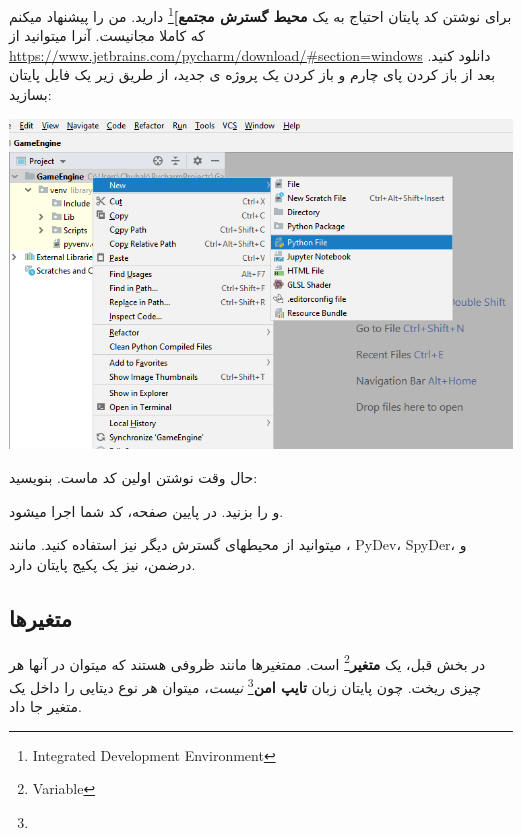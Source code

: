 \documentclass[14pt,a4paper]{memoir}
\begin{document}
	 برای نوشتن کد پایتان احتیاج به یک \textbf{محیط گسترش مجتمع]}\footnote{Integrated Development Environment} دارید. من  را پیشنهاد میکنم که کاملا مجانیست. آنرا میتوانید از \url{https://www.jetbrains.com/pycharm/download/#section=windows} دانلود کنید. 
	 بعد از باز کردن پای چارم و باز کردن یک پروژه ی جدید، از طریق زیر یک فایل پایتان بسازید:
	 
	 \begin{center}
	 	\includegraphics[scale=0.6]{CreateNewPythonFile}
	 	\end{center}
 	
 	حال وقت نوشتن اولین کد ماست. بنویسید:
 	
 	
 	\begin{latin}
 	
 \end{latin}
و   را بزنید. در پایین صفحه، کد شما اجرا میشود.
\begin{tip}
	میتوانید از محیطهای گسترش دیگر نیز استفاده کنید. مانند ، PyDev، SpyDer، و درضمن،  نیز یک پکیج پایتان دارد.
\end{tip}


	 
	 
	 
	 \subsection{متغیرها}\label{vars}
	 در بخش قبل،  یک \textbf{متغیر}\footnote{Variable} است. ممتغیرها مانند ظروفی هستند که میتوان در آنها هر چیزی ریخت. چون پایتان زبان \textbf{تایپ امن}\footnote{} \textit{نیست}، میتوان هر نوع دیتایی را داخل یک متغیر جا داد.
	 
\end{document}
